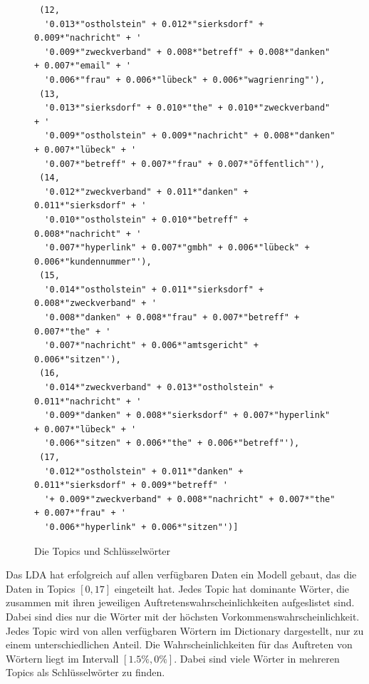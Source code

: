 \documentclass[german,version-2020-11]{uzl-thesis}
\begin{document}
  \begin{figure}[h]
  \begin{lstlisting}
 (12,
  '0.013*"ostholstein" + 0.012*"sierksdorf" + 0.009*"nachricht" + '
  '0.009*"zweckverband" + 0.008*"betreff" + 0.008*"danken" + 0.007*"email" + '
  '0.006*"frau" + 0.006*"lübeck" + 0.006*"wagrienring"'),
 (13,
  '0.013*"sierksdorf" + 0.010*"the" + 0.010*"zweckverband" + '
  '0.009*"ostholstein" + 0.009*"nachricht" + 0.008*"danken" + 0.007*"lübeck" + '
  '0.007*"betreff" + 0.007*"frau" + 0.007*"öffentlich"'),
 (14,
  '0.012*"zweckverband" + 0.011*"danken" + 0.011*"sierksdorf" + '
  '0.010*"ostholstein" + 0.010*"betreff" + 0.008*"nachricht" + '
  '0.007*"hyperlink" + 0.007*"gmbh" + 0.006*"lübeck" + 0.006*"kundennummer"'),
 (15,
  '0.014*"ostholstein" + 0.011*"sierksdorf" + 0.008*"zweckverband" + '
  '0.008*"danken" + 0.008*"frau" + 0.007*"betreff" + 0.007*"the" + '
  '0.007*"nachricht" + 0.006*"amtsgericht" + 0.006*"sitzen"'),
 (16,
  '0.014*"zweckverband" + 0.013*"ostholstein" + 0.011*"nachricht" + '
  '0.009*"danken" + 0.008*"sierksdorf" + 0.007*"hyperlink" + 0.007*"lübeck" + '
  '0.006*"sitzen" + 0.006*"the" + 0.006*"betreff"'),
 (17,
  '0.012*"ostholstein" + 0.011*"danken" + 0.011*"sierksdorf" + 0.009*"betreff" '
  '+ 0.009*"zweckverband" + 0.008*"nachricht" + 0.007*"the" + 0.007*"frau" + '
  '0.006*"hyperlink" + 0.006*"sitzen"')]
\end{lstlisting}
\caption{Die Topics und Schlüsselwörter}
\label{fig:codeoutput}
\end{figure}

Das LDA hat erfolgreich auf allen verfügbaren Daten ein Modell gebaut, das die Daten in Topics $[0,17]$ eingeteilt hat. Jedes Topic hat dominante Wörter, die zusammen mit ihren jeweiligen Auftretenswahrscheinlichkeiten aufgeslistet sind. Dabei sind dies nur die Wörter mit der höchsten Vorkommenswahrscheinlichkeit. Jedes Topic wird von allen verfügbaren Wörtern im Dictionary dargestellt, nur zu einem unterschiedlichen Anteil. Die Wahrscheinlichkeiten für das Auftreten von Wörtern liegt im Intervall $[1.5\%,0\%]$. Dabei sind viele Wörter in mehreren Topics als Schlüsselwörter zu finden. \\
\end{document}
